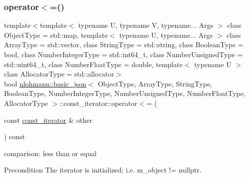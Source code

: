 \subsubsection{\texorpdfstring{operator$<$=()}{operator<=()}}
{\footnotesize\ttfamily template$<$template$<$ typename U, typename V, typename... Args $>$ class Object\+Type = std\+::map, template$<$ typename U, typename... Args $>$ class Array\+Type = std\+::vector, class String\+Type  = std\+::string, class Boolean\+Type  = bool, class Number\+Integer\+Type  = std\+::int64\+\_\+t, class Number\+Unsigned\+Type  = std\+::uint64\+\_\+t, class Number\+Float\+Type  = double, template$<$ typename U $>$ class Allocator\+Type = std\+::allocator$>$ \\
bool \hyperlink{classnlohmann_1_1basic__json}{nlohmann\+::basic\+\_\+json}$<$ Object\+Type, Array\+Type, String\+Type, Boolean\+Type, Number\+Integer\+Type, Number\+Unsigned\+Type, Number\+Float\+Type, Allocator\+Type $>$\+::const\+\_\+iterator\+::operator$<$= (\begin{DoxyParamCaption}\item[{const \hyperlink{classnlohmann_1_1basic__json_1_1const__iterator}{const\+\_\+iterator} \&}]{other }\end{DoxyParamCaption}) const\hspace{0.3cm}{\ttfamily [inline]}}



comparison\+: less than or equal 

\begin{DoxyPrecond}{Precondition}
The iterator is initialized; i.\+e. {\ttfamily m\+\_\+object != nullptr}. 
\end{DoxyPrecond}
\mbox{\label{classnlohmann_1_1basic__json_1_1const__iterator_a2b6561a7b39b9aa3a220aa3b6e2d9589}} 
